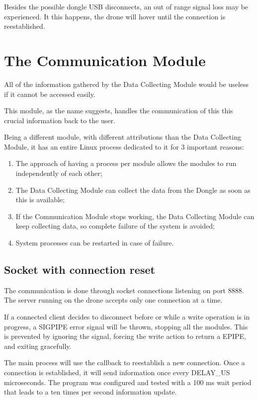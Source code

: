 Besides the possible dongle USB disconnects, an out of range signal loss may be experienced. It this happens, the drone will hover until the connection is reestablished.

\section{The Communication Module}

All of the information gathered by the Data Collecting Module would be useless if it cannot be accessed easily.

This module, as the name suggests, handles the communication of this this crucial information back to the user.

Being a different module, with different attributions than the Data Collecting Module, it has an entire Linux process dedicated to it for 3 important reasons:
\begin{enumerate}

\item The approach of having a process per module allows the modules to run independently of each other;
\item The Data Collecting Module can collect the data from the Dongle as soon as this is available;
\item If the Communication Module stops working, the Data Collecting Module can keep collecting data, so complete failure of the system is avoided;
\item System processes can be restarted in case of failure.

\end{enumerate}

\subsection{Socket with connection reset}

The communication is done through socket connections listening on port 8888. The server running on the drone accepts only one connection at a time.

If a connected client decides to disconnect before or while a write operation is in progress, a SIGPIPE error signal will be thrown, stopping all the modules. This is prevented by ignoring the signal, forcing the write action to return a EPIPE, and exiting gracefully.

The main process will use the callback  to reestablish a new connection. Once a connection is established, it will send information once every DELAY\_US microseconds. The program was configured and tested with a 100 ms wait period that leads to a ten times per second information update.

